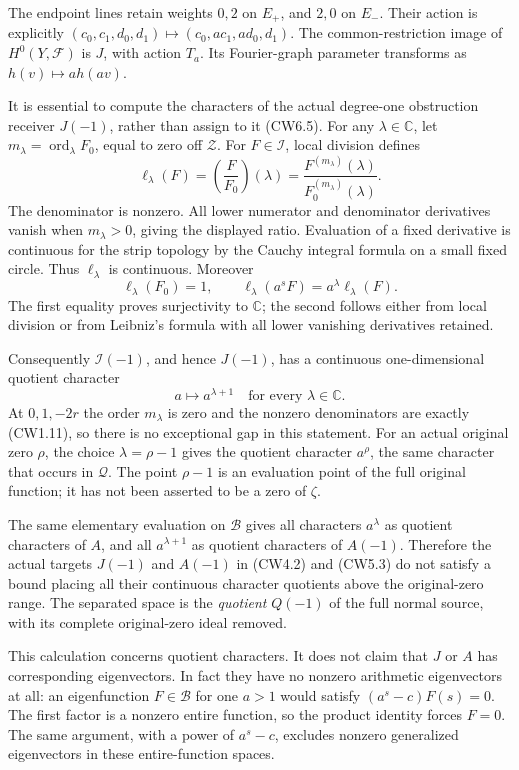 The endpoint lines retain weights \(0,2\) on \(E_+\), and \(2,0\) on
\(E_-\). Their action is explicitly
\((c_0,c_1,d_0,d_1)\mapsto(c_0,ac_1,ad_0,d_1)\). The common-restriction
image of \(H^0(Y,\mathscr F)\) is \(J\), with action \(T_a\). Its
Fourier-graph parameter transforms as \(h(v)\mapsto a h(av)\).

It is essential to compute the characters of the actual degree-one
obstruction receiver \(J(-1)\), rather than assign to it (CW6.5). For
any \(\lambda\in\mathbb C\), let
\(m_\lambda=\operatorname{ord}_\lambda F_0\), equal to zero off
\(\mathscr Z\). For \(F\in\mathcal I\), local division defines \[
\ell_\lambda(F)=\left(\frac{F}{F_0}\right)(\lambda)
=\frac{F^{(m_\lambda)}(\lambda)}
{F_0^{(m_\lambda)}(\lambda)}.
\tag{CW6.6}
\] The denominator is nonzero. All lower numerator and denominator
derivatives vanish when \(m_\lambda>0\), giving the displayed ratio.
Evaluation of a fixed derivative is continuous for the strip topology by
the Cauchy integral formula on a small fixed circle. Thus
\(\ell_\lambda\) is continuous. Moreover \[
\ell_\lambda(F_0)=1,\qquad
\ell_\lambda(a^sF)=a^\lambda\ell_\lambda(F).
\tag{CW6.7}
\] The first equality proves surjectivity to \(\mathbb C\); the second
follows either from local division or from Leibniz's formula with all
lower vanishing derivatives retained.

Consequently \(\mathcal I(-1)\), and hence \(J(-1)\), has a continuous
one-dimensional quotient character \[
a\longmapsto a^{\lambda+1}
\quad\text{for every }\lambda\in\mathbb C.
\tag{CW6.8}
\] At \(0,1,-2r\) the order \(m_\lambda\) is zero and the nonzero
denominators are exactly (CW1.11), so there is no exceptional gap in
this statement. For an actual original zero \(\rho\), the choice
\(\lambda=\rho-1\) gives the quotient character \(a^\rho\), the same
character that occurs in \(\mathcal Q\). The point \(\rho-1\) is an
evaluation point of the full original function; it has not been asserted
to be a zero of \(\zeta\).

The same elementary evaluation on \(\mathcal B\) gives all characters
\(a^\lambda\) as quotient characters of \(A\), and all \(a^{\lambda+1}\)
as quotient characters of \(A(-1)\). Therefore the actual targets
\(J(-1)\) and \(A(-1)\) in (CW4.2) and (CW5.3) do not satisfy a bound
placing all their continuous character quotients above the original-zero
range. The separated space is the \emph{quotient} \(Q(-1)\) of the full
normal source, with its complete original-zero ideal removed.

This calculation concerns quotient characters. It does not claim that
\(J\) or \(A\) has corresponding eigenvectors. In fact they have no
nonzero arithmetic eigenvectors at all: an eigenfunction
\(F\in\mathcal B\) for one \(a>1\) would satisfy \((a^s-c)F(s)=0\). The
first factor is a nonzero entire function, so the product identity
forces \(F=0\). The same argument, with a power of \(a^s-c\), excludes
nonzero generalized eigenvectors in these entire-function spaces.

